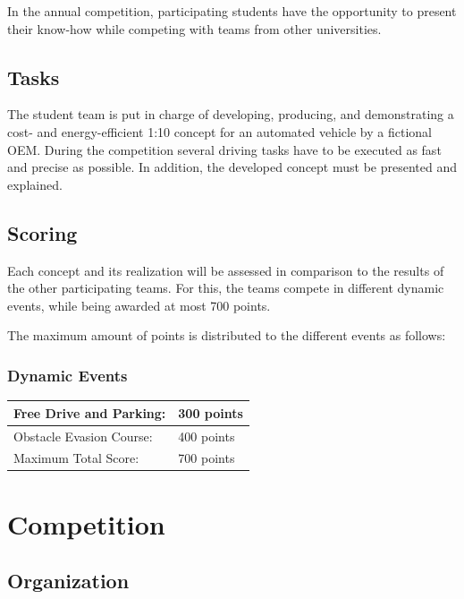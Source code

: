 \documentclass[a4paper]{report}
\begin{document}
In the annual competition, participating students have the opportunity to
present their know-how while competing with teams from other universities.

\section{Tasks}

The student team is put in charge of developing, producing, and demonstrating a
cost- and energy-efficient 1:10 concept for an automated vehicle by a fictional
OEM. During the competition several driving tasks have to be executed as fast
and precise as possible. In addition, the developed concept must be presented
and explained.

\section{Scoring}

Each concept and its realization will be assessed in comparison to the results
of the other participating teams. For this, the teams compete in different
dynamic events, while being awarded at most 700 points.

The maximum amount of points is distributed to the different events as follows:

\subsection{Dynamic Events}

\begin{table}[h]
	\begin{tabular}{|l|l|}
		\hline
		Free Drive and Parking:  & 300 points \\ \hline
		Obstacle Evasion Course: & 400 points \\ \hline\hline
		Maximum Total Score:     & 700 points \\ \hline
	\end{tabular}
\end{table}

\chapter{Competition}

\section{Organization}
\end{document}
